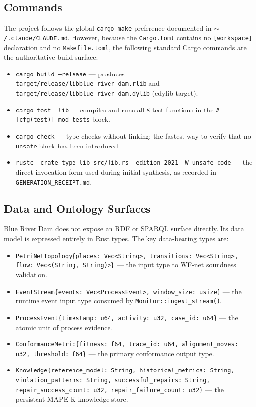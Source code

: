 \subsection{Commands}
\label{sec:blue-river-dam-implementation-commands}

The project follows the global \texttt{cargo make} preference documented in
\texttt{$\sim$/.claude/CLAUDE.md}. However, because the \texttt{Cargo.toml}
contains no \texttt{[workspace]} declaration and no \texttt{Makefile.toml},
the following standard Cargo commands are the authoritative build surface:

\begin{itemize}
  \item \texttt{cargo build --release} --- produces
    \texttt{target/release/libblue\_river\_dam.rlib} and
    \texttt{target/release/libblue\_river\_dam.dylib} (cdylib target).
  \item \texttt{cargo test --lib} --- compiles and runs all 8 test functions
    in the \texttt{\#[cfg(test)] mod tests} block.
  \item \texttt{cargo check} --- type-checks without linking; the fastest
    way to verify that no \texttt{unsafe} block has been introduced.
  \item \texttt{rustc --crate-type lib src/lib.rs --edition 2021 -W unsafe-code}
    --- the direct-invocation form used during initial synthesis, as recorded
    in \texttt{GENERATION\_RECEIPT.md}.
\end{itemize}

\subsection{Data and Ontology Surfaces}
\label{sec:blue-river-dam-implementation-data}

Blue River Dam does not expose an RDF or SPARQL surface directly. Its data
model is expressed entirely in Rust types. The key data-bearing types are:

\begin{itemize}
  \item \texttt{PetriNetTopology\{places: Vec<String>, transitions: Vec<String>,
    flow: Vec<(String, String)>\}} --- the input type to WF-net soundness
    validation.
  \item \texttt{EventStream\{events: Vec<ProcessEvent>, window\_size: usize\}} ---
    the runtime event input type consumed by \texttt{Monitor::ingest\_stream()}.
  \item \texttt{ProcessEvent\{timestamp: u64, activity: u32, case\_id: u64\}} ---
    the atomic unit of process evidence.
  \item \texttt{ConformanceMetric\{fitness: f64, trace\_id: u64, alignment\_moves: u32,
    threshold: f64\}} --- the primary conformance output type.
  \item \texttt{Knowledge\{reference\_model: String, historical\_metrics: String,
    violation\_patterns: String, successful\_repairs: String,
    repair\_success\_count: u32, repair\_failure\_count: u32\}} --- the
    persistent MAPE-K knowledge store.
\end{itemize}

